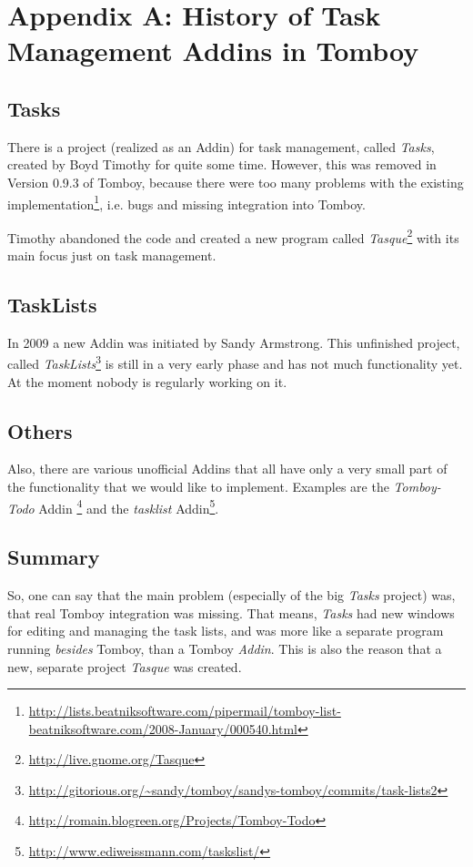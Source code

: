 \clearpage
\appendix
\section{Appendix A: History of Task Management Addins in Tomboy}

\label{appendix:history}
\subsection{Tasks}
There is a project (realized as an Addin) for task management, called \textit{Tasks}, created by Boyd Timothy for quite some time. However, this was removed in Version 0.9.3 of Tomboy, because there were too many problems with the existing implementation\footnote{\url{http://lists.beatniksoftware.com/pipermail/tomboy-list-beatniksoftware.com/2008-January/000540.html}}, i.e. bugs and missing integration into Tomboy.

Timothy abandoned the code and created a new program called \textit{Tasque}\footnote{\url{http://live.gnome.org/Tasque}} with its main focus just on task management.

\subsection{TaskLists}
In 2009 a new Addin was initiated by Sandy Armstrong. This unfinished project, called \textit{TaskLists}\footnote{\url{http://gitorious.org/~sandy/tomboy/sandys-tomboy/commits/task-lists2}} is still in a very early phase and has not much functionality yet. At the moment nobody is regularly working on it.

\subsection{Others}
Also, there are various unofficial Addins that all have only a very small part of the functionality that we would like to implement. Examples are the \textit{Tomboy-Todo} Addin \footnote{\url{http://romain.blogreen.org/Projects/Tomboy-Todo}} and the \textit{tasklist} Addin\footnote{\url{http://www.ediweissmann.com/taskslist/}}.

\subsection{Summary}
\label{lessons}
So, one can say that the main problem (especially of the big \textit{Tasks} project) was, that real Tomboy integration was missing. That means, \textit{Tasks} had new windows for editing and managing the task lists, and was more like a separate program running \textit{besides} Tomboy, than a Tomboy \textit{Addin}. This is also the reason that a new, separate project \textit{Tasque} was created.
